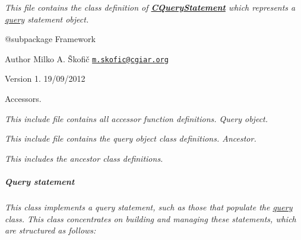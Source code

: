 {\itshape This file contains the class definition of {\bfseries \hyperlink{class_c_query_statement}{C\-Query\-Statement}} which represents a \hyperlink{class_c_query}{query} statement object.}

{\itshape \begin{DoxyVerb} @subpackage        Framework
\end{DoxyVerb}
}

{\itshape \begin{DoxyAuthor}{Author}
Milko A. Škofič \href{mailto:m.skofic@cgiar.org}{\tt m.\-skofic@cgiar.\-org} 
\end{DoxyAuthor}
\begin{DoxyVersion}{Version}
1. 19/09/2012
\end{DoxyVersion}
Accessors.}

{\itshape This include file contains all accessor function definitions. Query object.}

{\itshape This include file contains the query object class definitions. Ancestor.}

{\itshape This includes the ancestor class definitions. \subparagraph*{Query statement}}

{\itshape }

{\itshape This class implements a query statement, such as those that populate the \hyperlink{class_c_query}{query} class. This class concentrates on building and managing these statements, which are structured as follows\-:}

